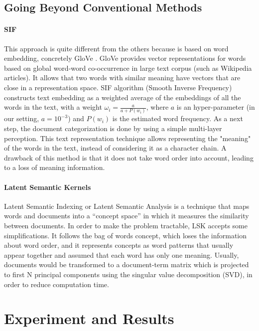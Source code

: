 \documentclass{article}
\begin{document}
\FloatBarrier
\subsection{Going Beyond Conventional Methods}

\paragraph{SIF}

This approach is quite different from the others because is based on word embedding, concretely GloVe \cite{11}. GloVe provides vector representations for words based on global word-word co-occurrence in large text corpus (such as Wikipedia articles). It allows that two words with similar meaning have vectors that are close in a representation space. SIF algorithm \cite{12} (Smooth Inverse Frequency) constructs text embedding as a weighted average of the embeddings of all the words in the text, with a weight $\omega_i = \frac{a}{a + P(w_i)}$, where $a$ is an hyper-parameter (in our setting, $a = 10^{-3}$) and $P(w_i)$ is the estimated word frequency. As a next step, the document categorization is done by using a simple multi-layer perception. This text representation technique allows representing the "meaning" of the words in the text, instead of considering it as a character chain. A drawback of this method is that it does not take word order into account, leading to a loss of meaning information.

\paragraph{Latent Semantic Kernels}

Latent Semantic Indexing or Latent Semantic Analysis is a technique that maps words and documents into a “concept space” in which it measures the similarity between documents\cite{13}. In order to make the problem tractable, LSK accepts some simplifications. It follows the bag of words concept, which loses the information about word order, and it represents concepts as word patterns that usually appear together and assumed that each word has only one meaning. Usually, documents would be transformed to a document-term matrix which is projected to first N principal components using the singular value decomposition (SVD), in order to reduce computation time.

\FloatBarrier
\section{Experiment and Results}
\end{document}
